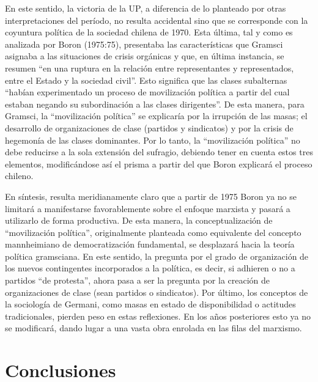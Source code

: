 En este sentido, la victoria de la UP, a diferencia de lo planteado por otras interpretaciones del período, no resulta accidental sino que se corresponde con la coyuntura política de la sociedad chilena de 1970. Esta última, tal y como es analizada por Boron (1975:75), presentaba las características que Gramsci asignaba a las situaciones de crisis orgánicas y que, en última instancia, se resumen \enquote{en una ruptura en la relación entre representantes y representados, entre el Estado y la sociedad civil}. Esto significa que las clases subalternas \enquote{habían experimentado un proceso de movilización política a partir del cual estaban negando su subordinación a las clases dirigentes}. De esta manera, para Gramsci, la \enquote{movilización política} se explicaría por la irrupción de las masas; el desarrollo de organizaciones de clase (partidos y sindicatos) y por la crisis de hegemonía de las clases dominantes. Por lo tanto, la \enquote{movilización política} no debe reducirse a la sola extensión del sufragio, debiendo tener en cuenta estos tres elementos, modificándose así el prisma a partir del que Boron explicará el proceso chileno.

En síntesis, resulta meridianamente claro que a partir de 1975 Boron ya no se limitará a manifestarse favorablemente sobre el enfoque marxista y pasará a utilizarlo de forma productiva. De esta manera, la conceptualización de \enquote{movilización política}, originalmente planteada como equivalente del concepto mannheimiano de democratización fundamental, se desplazará hacia la teoría política gramsciana. En este sentido, la pregunta por el grado de organización de los nuevos contingentes incorporados a la política, es decir, si adhieren o no a partidos \enquote{de protesta}, ahora pasa a ser la pregunta por la creación de organizaciones de clase (sean partidos o sindicatos). Por último, los conceptos de la sociología de Germani, como masas en estado de disponibilidad o actitudes tradicionales, pierden peso en estas reflexiones. En los años posteriores esto ya no se modificará, dando lugar a una vasta obra enrolada en las filas del marxismo.

\section{Conclusiones}

